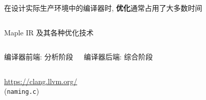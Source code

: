 \begin{frame}{}
  \begin{center}
    在设计实际生产环境中的编译器时, {\bf 优化}通常占用了大多数时间
  \end{center}

  \begin{columns}
  \end{columns}

  \vspace{0.50cm}
  \begin{center}
    Maple IR 及其各种优化技术
  \end{center}
\end{frame}

\begin{frame}{}
  \begin{columns}
      \begin{center}
        编译器前端: 分析阶段
      \end{center}
      \begin{center}
        编译器后端: 综合阶段
      \end{center}
  \end{columns}
\end{frame}

\begin{frame}{}
  \begin{center}

    \vspace{0.30cm}
    \url{https://clang.llvm.org/}\\[5pt]
    (\texttt{naming.c})
  \end{center}
\end{frame}

